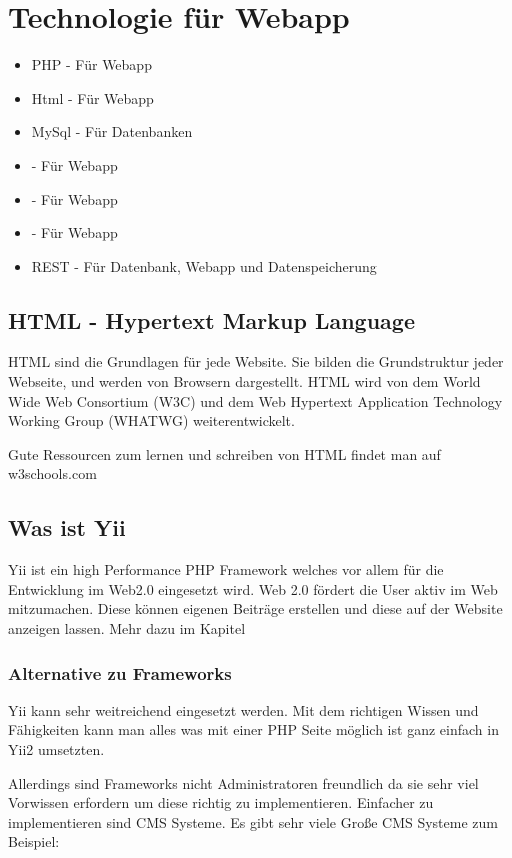 \newpage	
\def \currentAuthor {Florian Tipotsch}
	\section{Technologie für Webapp}
\begin{itemize}
	\item PHP - Für Webapp
	\item Html - Für Webapp 	
	\item MySql - Für Datenbanken
	\item {} - Für Webapp
	\item {} - Für Webapp
	\item {} - Für Webapp
	\item REST - Für Datenbank, Webapp und Datenspeicherung
\end{itemize}
	\subsection{HTML - Hypertext Markup Language}
	HTML sind die Grundlagen für jede Website. Sie bilden die Grundstruktur jeder Webseite, und werden von Browsern dargestellt. HTML wird von dem World Wide Web Consortium (W3C) \cite{W3C} und dem Web Hypertext Application Technology Working Group (WHATWG) \cite{WHATWG} weiterentwickelt.
	
	Gute Ressourcen zum lernen und schreiben von HTML findet man auf w3schools.com \cite {W3schools}
	
	\subsection{Was ist Yii}
	Yii ist ein high Performance PHP Framework welches vor allem für die Entwicklung im Web2.0 eingesetzt wird. Web 2.0 fördert die User aktiv im Web mitzumachen. Diese können eigenen Beiträge erstellen und diese auf der Website anzeigen lassen. Mehr dazu im Kapitel \cite{Web_2}

	\subsubsection{Alternative zu Frameworks}
	Yii kann sehr weitreichend eingesetzt werden. Mit dem richtigen Wissen und Fähigkeiten kann man alles was mit einer PHP Seite möglich ist ganz einfach in Yii2 umsetzten.

Allerdings sind Frameworks nicht Administratoren freundlich da sie sehr viel Vorwissen erfordern um diese richtig zu implementieren. Einfacher zu implementieren sind CMS Systeme. Es gibt sehr viele Große CMS Systeme zum Beispiel:

